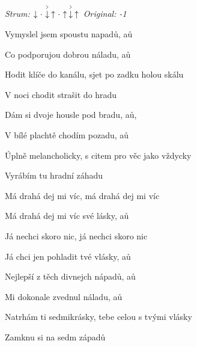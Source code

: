 \begin{song}


\textit{Strum:} $\Down\Miss\AccentDown\Up\Miss\Up\AccentDown\Up$ \quad
\textit{Original: -1}

\large


\Large

\bigskip

Vymyslel jsem spoustu napadů, aů \par
Co podporujou dobrou náladu, aů \par
{}Hodit klíče do kanálu, sjet po zadku holou skálu \par
{}V noci chodit strašit do hradu \par

\bigskip

Dám si dvoje housle pod bradu, aů,  \par
{}V bílé plachtě chodím pozadu, aů \par
{}Úplně melancholicky, s citem pro věc jako vždycky \par
{}Vyrábím tu hradní záhadu  \par

\bigskip

\begin{chorusbox}{\Refren}
 Má drahá dej mi víc,  má drahá dej mi víc \par
{} Má drahá dej mi víc své lásky, aů \par
{} Já nechci skoro nic,  já nechci skoro nic \par
{} Já chci jen pohladit tvé vlásky, aů \par
\end{chorusbox}

\bigskip

Nejlepší z těch divnejch nápadů, aů \par
Mi dokonale zvednul náladu, aů \par
{}Natrhám ti sedmikrásky, tebe celou s tvými vlásky \par
{}Zamknu si na sedm západů  \par


\end{song}

